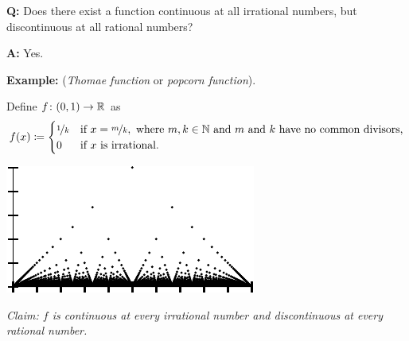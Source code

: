 \documentclass[10pt,aspectratio=149]{beamer}
\begin{document}
\begin{frame}

\textbf{Q:}
Does there exist a function continuous at all irrational numbers, but
discontinuous at all rational numbers?

\pause
\medskip

\textbf{A:} Yes.

\pause
\medskip


\textbf{Example:} (\emph{Thomae function} or \emph{popcorn function}).

Define $f \colon (0,1) \to {\mathbb{R}}$ as
\begin{equation*}
f(x) \coloneqq 
\begin{cases}
\nicefrac{1}{k} & \text{if } x=\nicefrac{m}{k}, \text{ where } m,k \in {\mathbb{N}}
\text{ and } m \text{ and } k \text{ have no common divisors,} \\
0 & \text{if } x \text{ is irrational.}
\end{cases}
\end{equation*}

\begin{center}
\includegraphics{../figures/popcornfig}
\end{center}

\pause
\medskip

\emph{Claim: $f$ is continuous at every irrational number and discontinuous at every
rational number.}

\end{frame}
\end{document}
